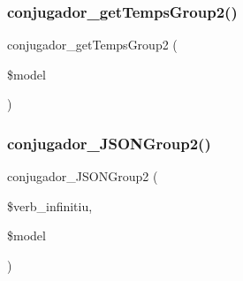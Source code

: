 \subsubsection{\texorpdfstring{conjugador\+\_\+get\+Temps\+Group2()}{conjugador\_getTempsGroup2()}}
{\footnotesize\ttfamily conjugador\+\_\+get\+Temps\+Group2 (\begin{DoxyParamCaption}\item[{}]{\$model }\end{DoxyParamCaption})}

\hypertarget{php_2conjugador__gr2_8inc_a23811a826aba996459214db8b2176a60}{}\label{php_2conjugador__gr2_8inc_a23811a826aba996459214db8b2176a60} 
\subsubsection{\texorpdfstring{conjugador\+\_\+\+J\+S\+O\+N\+Group2()}{conjugador\_JSONGroup2()}}
{\footnotesize\ttfamily conjugador\+\_\+\+J\+S\+O\+N\+Group2 (\begin{DoxyParamCaption}\item[{}]{\$verb\+\_\+infinitiu,  }\item[{}]{\$model }\end{DoxyParamCaption})}

